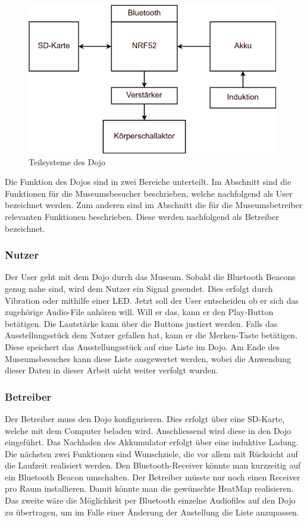 \begin{figure}[H]
	\begin{center}
		\includegraphics[width=110mm]{data/Loesungskonzept_Teilsysteme.png}
		\caption{Teilsysteme des Dojo} %
		\label{fig:Teilsysteme}
	\end{center}
\end{figure}

Die Funktion des Dojos sind in zwei Bereiche unterteilt. Im Abschnitt  sind die Funktionen für die Museumsbesucher beschrieben, welche nachfolgend als User bezeichnet werden. Zum anderen sind im Abschnitt  die für die Museumsbetreiber relevanten Funktionen beschrieben. Diese werden nachfolgend als Betreiber bezeichnet.

\subsubsection*{Nutzer} \label{sec:funktionNutzer}
Der User geht mit dem Dojo durch das Museum. Sobald die Bluetooth Beacons genug nahe sind, wird dem Nutzer ein Signal gesendet. Dies erfolgt durch Vibration oder mithilfe einer LED. Jetzt soll der User entscheiden ob er sich das zugehörige Audio-File anhören will. Will er das, kann er den Play-Button betätigen. Die Lautstärke kann über die Buttons justiert werden. Falls das Ausstellungsstück dem Nutzer gefallen hat, kann er die Merken-Taste betätigen. Diese speichert das Ausstellungsstück auf eine Liste im Dojo. Am Ende des Museumsbesuches kann diese Liste ausgewertet werden, wobei die Anwendung dieser Daten in dieser Arbeit nicht weiter verfolgt wurden.

\subsubsection*{Betreiber} \label{sec:funktionBetreiber}
Der Betreiber muss den Dojo konfigurieren. Dies erfolgt über eine SD-Karte, welche mit dem Computer beladen wird. Anschliessend wird diese in den Dojo eingeführt. Das Nachladen des Akkumulator erfolgt über eine induktive Ladung. Die nächsten zwei Funktionen sind Wunschziele, die vor allem mit Rücksicht auf die Laufzeit realisiert werden. Den Bluetooth-Receiver könnte man kurzzeitig auf ein Bluetooth Beacon umschalten. Der Betreiber müsste nur noch einen Receiver pro Raum installieren. Damit könnte man die gewünschte HeatMap realisieren. Das zweite wäre die Möglichkeit per Bluetooth einzelne Audiofiles auf den Dojo zu übertragen, um im Falle einer Änderung der Austellung die Liste anzupassen.
